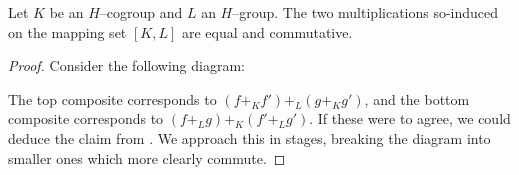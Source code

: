 \begin{corollary}
Let $K$ be an $H$--cogroup and $L$ an $H$--group.
The two multiplications so-induced on the mapping set $[K, L]$ are equal and commutative.
\end{corollary}
\begin{proof}
Consider the following diagram:
\begin{center}
\end{center}
The top composite corresponds to $(f +_K f') +_L (g +_K g')$, and the bottom composite corresponds to $(f +_L g) +_K (f' +_L g')$.
If these were to agree, we could deduce the claim from .
We approach this in stages, breaking the diagram into smaller ones which more clearly commute.


\end{proof}
